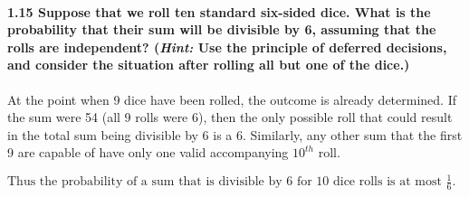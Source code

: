 \documentclass{article}
\begin{document}
\paragraph{1.15 Suppose that we roll ten standard six-sided dice. What is 
the probability that their sum will be divisible by 6, assuming that the 
rolls are independent? (\emph{Hint:} Use the principle of deferred 
decisions, and consider the situation after rolling all but one of the 
dice.)\\}
At the point when 9 dice have been rolled, the outcome is already 
determined. If the sum were 54 (all 9 rolls were 6), then the only possible 
roll that could result in the total sum being divisible by 6 is a 6. 
Similarly, any other sum that the first 9 are capable of have only one 
valid accompanying $10^{th}$ roll.
\begin{center}
$\boxed{\mbox{Thus the probability of a sum that is divisible by 6 for 10
dice rolls is at most } \frac{1}{6}.}$
\end{center}
\end{document}
